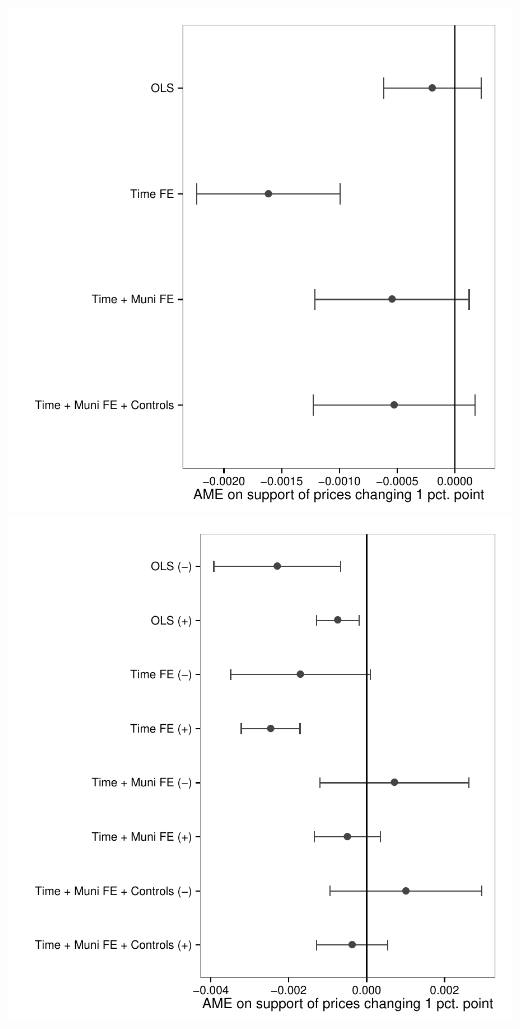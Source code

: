 \documentclass[aspectratio=169]{beamer}
\begin{document}
\begin{frame}
	\begin{columns}
		\includegraphics[width=1\textwidth]{../../figures/surveys_effplot1} 
     \pause
		\includegraphics[width=1\textwidth]{../../figures/surveys_effplot2}
		\end{columns} 		
 \end{frame}	
\end{document}
